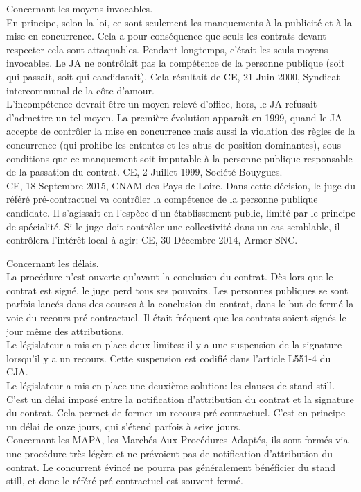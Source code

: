 \documentclass[10pt, a4paper, openany]{book}
\begin{document}
Concernant les moyens invocables. \\
En principe, selon la loi, ce sont seulement les manquements à la publicité et à la mise en concurrence. Cela a pour conséquence que seuls les contrats devant respecter cela sont attaquables. Pendant longtemps, c'était les seuls moyens invocables. Le JA ne contrôlait pas la compétence de la personne publique (soit qui passait, soit qui candidatait). Cela résultait de CE, 21 Juin 2000, Syndicat intercommunal de la côte d'amour. \\
L'incompétence devrait être un moyen relevé d'office, hors, le JA refusait d'admettre un tel moyen. La première évolution apparaît en 1999, quand le JA accepte de contrôler la mise en concurrence mais aussi la violation des règles de la concurrence (qui prohibe les ententes et les abus de position dominantes), sous conditions que ce manquement soit imputable à la personne publique responsable de la passation du contrat. CE, 2 Juillet 1999, Société Bouygues. \\
CE, 18 Septembre 2015, CNAM des Pays de Loire. Dans cette décision, le juge du référé pré-contractuel va contrôler la compétence de la personne publique candidate. Il s'agissait en l'espèce d'un établissement public, limité par le principe de spécialité. Si le juge doit contrôler une collectivité dans un cas semblable, il contrôlera l'intérêt local à agir: CE, 30 Décembre 2014, Armor SNC. 


Concernant les délais. \\
La procédure n'est ouverte qu'avant la conclusion du contrat. Dès lors que le contrat est signé, le juge perd tous ses pouvoirs. Les personnes publiques se sont parfois lancés dans des courses à la conclusion du contrat, dans le but de fermé la voie du recours pré-contractuel. Il était fréquent que les contrats soient signés le jour même des attributions. \\
Le législateur a mis en place deux limites: il y a une suspension de la signature lorsqu'il y a un recours. Cette suspension est codifié dans l'article L551-4 du CJA. \\
Le législateur a mis en place une deuxième solution: les clauses de stand still. C'est un délai imposé entre la notification d'attribution du contrat et la signature du contrat. Cela permet de former un recours pré-contractuel. C'est en principe un délai de onze jours, qui s'étend parfois à seize jours. \\
Concernant les MAPA, les Marchés Aux Procédures Adaptés, ils sont formés via une procédure très légère et ne prévoient pas de notification d'attribution du contrat. Le concurrent évincé ne pourra pas généralement bénéficier du stand still, et donc le référé pré-contractuel est souvent fermé. 
\end{document}
